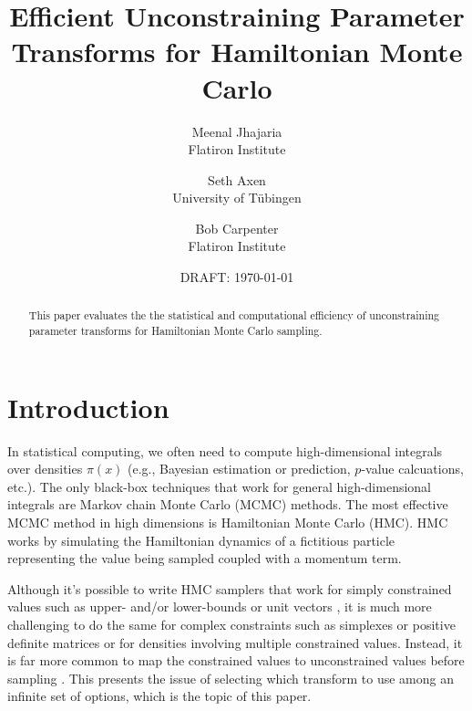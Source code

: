 \documentclass[11pt]{article}
\begin{document}
\title{Efficient Unconstraining
  Parameter Transforms for Hamiltonian Monte Carlo}
\author{Meenal Jhajaria \\ \small Flatiron Institute \and Seth Axen \\
  \small University of T\"ubingen \and Bob
  Carpenter \\ \small Flatiron Institute}
\date{DRAFT: \today}
\maketitle


\begin{abstract}
  \noindent
  This paper evaluates the the statistical and computational
  efficiency of unconstraining parameter transforms for Hamiltonian
  Monte Carlo sampling.
\end{abstract}

\section{Introduction}

In statistical computing, we often need to compute high-dimensional
integrals over densities $\pi(x)$ (e.g., Bayesian estimation or
prediction, $p$-value calcuations, etc.).  The only black-box
techniques that work for general high-dimensional integrals are
Markov chain Monte Carlo (MCMC) methods.  The most effective MCMC
method in high dimensions is Hamiltonian Monte Carlo (HMC).  HMC works
by simulating the Hamiltonian dynamics of a fictitious particle
representing the value being sampled coupled with a momentum term.

Although it's possible to write HMC samplers that work for simply
constrained values such as upper- and/or lower-bounds
\cite{neal2011mcmc} or unit vectors \cite{byrne2013geodesic}, it is
much more challenging to do the same for complex constraints such as
simplexes or positive definite matrices or for densities involving
multiple constrained values.  Instead, it is far more common to map
the constrained values to unconstrained values before sampling
\cite{}.  This presents the issue of selecting which transform to use
among an infinite set of options, which is the topic of this paper.

\end{document}
